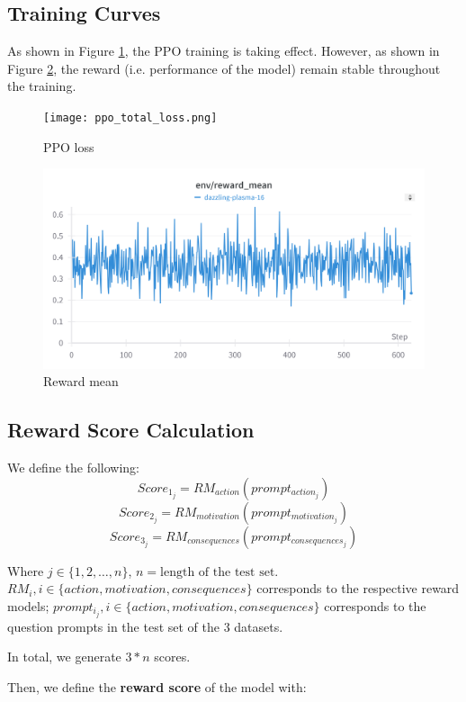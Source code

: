 \subsection{Training Curves}
As shown in Figure \ref{fig:ppo_loss}, the PPO training is taking effect. However, as shown in Figure \ref{fig:rmean}, the reward (i.e. performance of the model) remain stable throughout the training.



\begin{figure}[H]
\centering
\texttt{[image: ppo\_total\_loss.png]} %
\caption{PPO loss} %
\label{fig:ppo_loss} %
\end{figure}

\begin{figure}[H]
\centering
\includegraphics[width=0.8\linewidth]{Images/reward_mean.png} %
\caption{Reward mean} %
\label{fig:rmean} %
\end{figure}


\subsection{Reward Score Calculation}
We define the following:
$$Score_1_j = RM_{action}(prompt_{action_j})$$
$$Score_2_j = RM_{motivation}(prompt_{motivation_j})$$
$$Score_3_j = RM_{consequences}(prompt_{consequences_j})$$

Where $j \in \{1, 2, \ldots, n\}$, $n = \text{length of the test set}$.    $RM_i, i \in \{action, motivation, consequences\}$ corresponds to the respective reward models; $prompt_i_j, i \in \{action, motivation, consequences\} $ corresponds to the question prompts in the test set of the 3 datasets.

In total, we generate $3 * n $ scores.

Then, we define the \textbf{reward score} of the model with:

